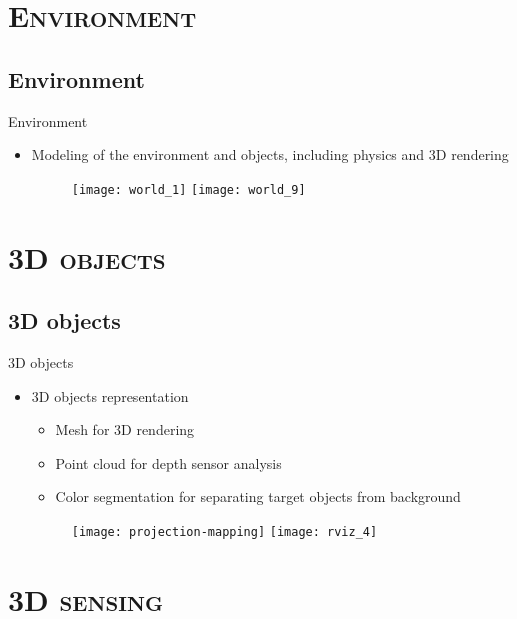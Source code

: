 \section{\scshape Environment}
\subsection*{Environment}
\begin{frame}{Environment}
	\begin{itemize}
		\item Modeling of the environment and objects, including physics and 3D rendering
		\begin{figure}[!ht]
			\centering
			\texttt{[image: world\_1]}
			\texttt{[image: world\_9]}
		\end{figure}
	\end{itemize}
\end{frame}


\section{\scshape 3D objects}
\subsection*{3D objects}
\begin{frame}{3D objects}
	\begin{itemize}
		\item 3D objects representation
		\begin{itemize}
			\item Mesh for 3D rendering
			\item Point cloud for depth sensor analysis
			\item Color segmentation for separating target objects from background
		\end{itemize}
		\begin{figure}[!ht]
			\centering
			\texttt{[image: projection-mapping]}
			\texttt{[image: rviz\_4]}
		\end{figure}
	\end{itemize}
\end{frame}


\section{\scshape 3D sensing}
